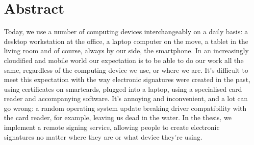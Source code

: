 \chapter*{Abstract}
\label{ch:abstract}


Today, we use a number of computing devices interchangeably on a daily basis: a desktop workstation at the office,
a laptop computer on the move, a tablet in the living room and of course, always by our side, the smartphone.
In an increasingly cloudified and mobile world our expectation is to be able to do our work all the same,
regardless of the computing device we use, or where we are.
It's difficult to meet this expectation with the way electronic signatures were created in the past,
using certificates on smartcards, plugged into a laptop, using a specialised card reader and accompanying software.
It's annoying and inconvenient, and a lot can go wrong:
a random operating system update breaking driver compatibility with the card reader, for example,
leaving us dead in the water.
In the thesis, we implement a remote signing service, allowing people to create electronic signatures no matter
where they are or what device they're using.

